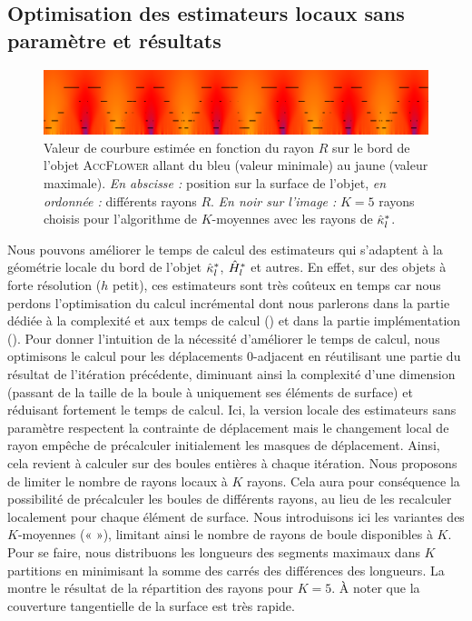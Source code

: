 \subsection{Optimisation des estimateurs locaux sans paramètre et résultats}
\label{sec:curvature:parameter-free:k-means}

\begin{figure}[ht]{
  \begin{center}
    \includegraphics[width=.95\linewidth]{images/Curvature/ScaleSpace_Flower_Local_5}
  \end{center}}
  \caption{Valeur de courbure estimée en fonction du rayon $R$ sur le bord de
  l'objet \textsc{AccFlower} allant du bleu (valeur minimale) au jaune (valeur
  maximale). \emph{En abscisse :} position sur la surface de l'objet, \emph{en
  ordonnée :} différents rayons $R$. \emph{En noir sur l'image :} $K = 5$ rayons
  choisis pour l'algorithme de $K$-moyennes avec les rayons de $\hat{\kappa}^{*}_{l}$.
  \label{fig:curvature-pfl-radii}}
\end{figure}

Nous pouvons améliorer le temps de calcul des estimateurs qui s'adaptent à la
géométrie locale du bord de l'objet $\hat{\kappa}^{*}_{l}$, $\hat{H}^{*}_{l}$ et autres. En
effet, sur des objets à forte résolution (\cad $h$ petit), ces estimateurs sont
très coûteux en temps car nous perdons l'optimisation du calcul incrémental dont
nous parlerons dans la partie dédiée à la complexité et aux temps de calcul
() et dans la partie implémentation
(). Pour donner l'intuition de la nécessité
d'améliorer le temps de calcul, nous optimisons le calcul pour les déplacements
$0$-adjacent en réutilisant une partie du résultat de l'itération précédente,
diminuant ainsi la complexité d'une dimension (passant de la taille de la boule à
uniquement ses éléments de surface) et réduisant fortement le temps de calcul.
Ici, la version locale des estimateurs sans paramètre respectent la contrainte
de déplacement mais le changement local de rayon empêche de précalculer
initialement les masques de déplacement. Ainsi, cela revient à calculer sur des
boules entières à chaque itération. Nous proposons de limiter le nombre de
rayons locaux à $K$ rayons. Cela aura pour conséquence la possibilité de
précalculer les boules de différents rayons, au lieu de les
recalculer localement pour chaque élément de surface. Nous introduisons ici les
variantes des $K$-moyennes («  »), limitant ainsi le nombre
de rayons de boule disponibles à $K$. Pour se faire, nous distribuons les
longueurs des segments maximaux dans $K$ partitions en minimisant la somme des
carrés des différences des longueurs. La 
montre le résultat de la répartition des rayons pour $K=5$. À noter que la
couverture tangentielle de la surface est très rapide.

